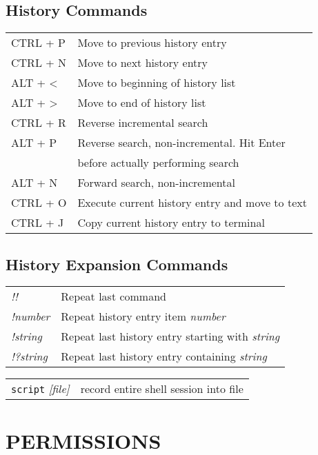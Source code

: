 \documentclass[8pt]{extarticle}
\begin{document}
\begin{multicols}{2}
\subsection{History Commands}
\begin{tabular}{ll}
	CTRL + P & Move to previous history entry\\
	CTRL + N & Move to next history entry\\
	ALT + \textless & Move to beginning of history list\\
	ALT + \textgreater & Move to end of history list\\
	CTRL + R & Reverse incremental search\\
	ALT + P & Reverse search, non-incremental. Hit Enter \\
	& before actually performing search\\
	ALT + N & Forward search, non-incremental\\
	CTRL + O & Execute current history entry and move to text\\
	CTRL + J & Copy current history entry to terminal
\end{tabular}

\subsection{History Expansion Commands}
\begin{tabular}{ll}
	\textit{!!} & Repeat last command\\
	\textit{!number} & Repeat history entry item \textit{number}\\
	\textit{!string} & Repeat last history entry starting with \textit{string}\\
	\textit{!?string} & Repeat last history entry containing \textit{string}
\end{tabular}

\begin{tabular}{ll}
	\texttt{script} \textit{[file]} & record entire shell session into file 
\end{tabular}

\section{PERMISSIONS}


\end{multicols}
\end{document}
